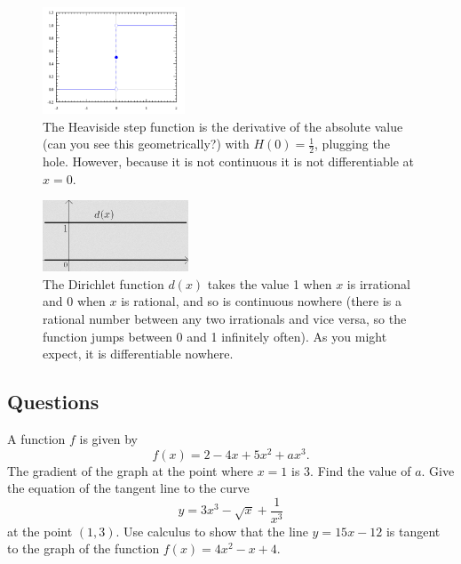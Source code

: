 \begin{figure}[h]
\begin{minipage}{0.5\textwidth}
\begin{center}
    \includegraphics[height=120px]{heaviside}\\
    \small{The Heaviside step function is the derivative of the absolute value (can you see this geometrically?) with $ H(0) = \frac{1}{2} $, plugging
           the hole. However, because it is not continuous it is not differentiable at $ x = 0 $.}
  \end{center}
  \end{minipage}
  \begin{minipage}{\textwidth}
  \begin{center}
    \includegraphics[height=80px]{dirichlet}\\
    \small{The Dirichlet function $ d(x) $ takes the value 1 when $ x $ is irrational and 0 when $ x $ is rational, and so is continuous nowhere
           (there is a rational number between any two irrationals and vice versa, so the function jumps between 0 and 1 infinitely often). As you
           might expect, it is differentiable nowhere.}
  \end{center}
  \end{minipage}
\end{figure}

\clearpage
\subsection*{Questions}
\begin{questions}
  \question A function $ f $ is given by
            \begin{equation}
              f(x) = 2 - 4x + 5x^2 + ax^3.
            \end{equation}
            The gradient of the graph at the point where $ x = 1 $ is 3. Find the value of $ a $.
  \question Give the equation of the tangent line to the curve
            \begin{displaymath}
              y = 3x^3 - \sqrt{x} + \frac{1}{x^3}
            \end{displaymath}
            at the point $ (1, 3) $.
  \question Use calculus to show that the line $ y = 15x - 12 $ is tangent to the graph of the function $ f(x) = 4x^2 - x + 4 $.
\end{questions}



